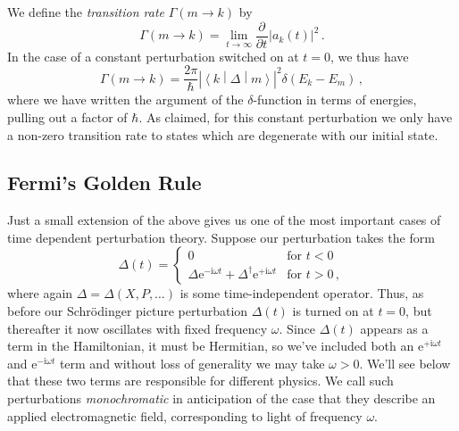 \documentclass{article}
\theoremstyle{plain}\theoremheaderfont{\normalfont\itshape}\theorembodyfont{\rmfamily}\theoremseparator{.}\newtheorem*{rem}{Remark}\newtheorem*{ex}{Example}\newtheorem*{proof}{Proof}\newtheorem*{altp}{Alternative proof}
\theoremstyle{plain}\theoremheaderfont{\normalfont\bfseries}\theorembodyfont{\rmfamily}\theoremseparator{.}\newtheorem{thm}{Theorem}[section]\newtheorem{lem}[thm]{Lemma}\newtheorem{prop}[thm]{Proposition}\newtheorem*{cor}{Corollary}\newtheorem{defn}[thm]{Definition}\newtheorem{clm}[thm]{Claim}\newtheorem{clminproof}{Claim}
\theoremstyle{break}\theoremheaderfont{\normalfont\itshape}\theorembodyfont{\rmfamily}\theoremseparator{.\medskip}\newtheorem*{proofskip}{Proof}\newtheorem*{exs}{Examples}\newtheorem*{rems}{Remarks}
\theoremstyle{break}\theoremheaderfont{\normalfont\bfseries}\theorembodyfont{\rmfamily}\theoremseparator{.\medskip}\newtheorem{lemskip}[thm]{Lemma}\newtheorem{defnskip}[thm]{Definition}\newtheorem{propskip}[thm]{Proposition}\newtheorem{thmskip}[thm]{Theorem}
\numberwithin{equation}{section}
\newcommand{\ii}{\mathrm{i}}
\newcommand{\ee}{\mathrm{e}}
\newcommand{\pdv}[3][]{\frac{\partial^{#1} #2}{{\partial #3}^{#1}}}
\newcommand{\mel}[3]{\left\langle #1 \middle| #2 \middle| #3 \right\rangle}
\newcommand{\abs}[1]{\left| #1 \right|}
\begin{document}
    We define the \textit{transition rate} \(\Gamma(m\to k)\) by
    \begin{equation}
        \Gamma(m\to k)=\lim_{t\to\infty}\pdv{}{t}\abs{a_k(t)}^2\,.
    \end{equation}
    In the case of a constant perturbation switched on at \(t=0\), we thus have
    \begin{equation}
        \Gamma(m\to k)=\frac{2\pi}{\hbar}\abs{\mel{k}{\Delta}{m}}^2\delta(E_k-E_m)\,,
    \end{equation}
    where we have written the argument of the \(\delta\)-function in terms of energies, pulling out a factor of \(\hbar\). As claimed, for this constant perturbation we only have a non-zero transition rate to states which are degenerate with our initial state.

    \subsection{Fermi's Golden Rule}
    Just a small extension of the above gives us one of the most important cases of time dependent perturbation theory. Suppose our perturbation takes the form
    \begin{equation}
        \Delta(t)=\begin{cases}
            0 & \text{for }t<0\\
            \Delta \ee^{-\ii \omega t}+\Delta^\dagger \ee^{+\ii \omega t} & \text{for }t>0\,,
        \end{cases}
    \end{equation}
    where again \(\Delta=\Delta(X,P,\dots)\) is some time-independent operator. Thus, as before our Schr\"{o}dinger picture perturbation \(\Delta(t)\) is turned on at \(t=0\), but thereafter it now oscillates with fixed frequency \(\omega\). Since \(\Delta(t)\) appears as a term in the Hamiltonian, it must be Hermitian, so we've included both an \(\ee^{+\ii \omega t}\) and \(\ee^{-\ii \omega t}\) term and without loss of generality we may take \(\omega>0\). We'll see below that these two terms are responsible for different physics. We call such perturbations \textit{monochromatic} in anticipation of the case that they describe an applied electromagnetic field, corresponding to light of frequency \(\omega\).
\end{document}
